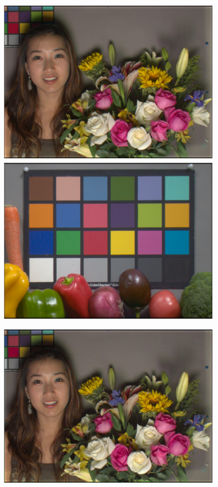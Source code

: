 \documentclass[]{spie}
\begin{document}
\begin{figure}[t]
\begin{center}
\begin{minipage}[b]{0.245\textwidth}
 \includegraphics[width=\textwidth]{Fig3/srgbI_AsianFemaleWithFlowers_RGBW1_Tungsten1_opt1}
 \includegraphics[width=\textwidth]{Fig3/srgbI_Vegetables_RGBW1_Tungsten1_opt1}
 \centering\small{}
\end{minipage}
\begin{minipage}[b]{0.245\textwidth}
 \includegraphics[width=\textwidth]{Fig3/srgbR_AsianFemaleWithFlowers_RGBW1_Tungsten1_opt2}

\end{minipage}
\end{center}
\end{figure}
\end{document}
